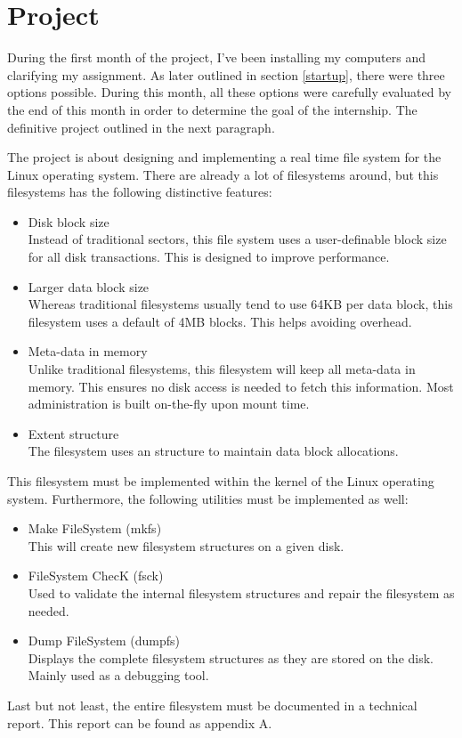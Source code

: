 \chapter{Project}
\label{project}

During the first month of the project, I've been installing my computers and clarifying my assignment. As later outlined in section \ref{startup}, there were three options possible. During this month, all these options were carefully evaluated by the end of this month in order to determine the goal of the internship. The definitive project outlined in the next paragraph.

The project is about designing and implementing a real time file system for the Linux operating system. There are already a lot of filesystems around, but this filesystems has the following distinctive features:

\begin{itemize}
\item Disk block size \\
Instead of traditional sectors, this file system uses a user-definable block size for all disk transactions. This is designed to improve performance.
\item Larger data block size \\
Whereas traditional filesystems usually tend to use 64KB per data block, this filesystem uses a default of 4MB blocks. This helps avoiding overhead.
\item Meta-data in memory \\
Unlike traditional filesystems, this filesystem will keep all meta-data in memory. This ensures no disk access is needed to fetch this information. Most administration is built on-the-fly upon mount time.
\item Extent structure \\
The filesystem uses an  structure to maintain data block allocations.
\end{itemize}

This filesystem must be implemented within the kernel of the Linux operating system. Furthermore, the following utilities must be implemented as well:

\begin{itemize}
\item Make FileSystem (mkfs) \\
This will create new filesystem structures on a given disk.
\item FileSystem ChecK (fsck) \\
Used to validate the internal filesystem structures and repair the filesystem as needed.
\item Dump FileSystem (dumpfs) \\
Displays the complete filesystem structures as they are stored on the disk. Mainly used as a debugging tool.
\end{itemize}

Last but not least, the entire filesystem must be documented in a technical report. This report can be found as appendix A.
